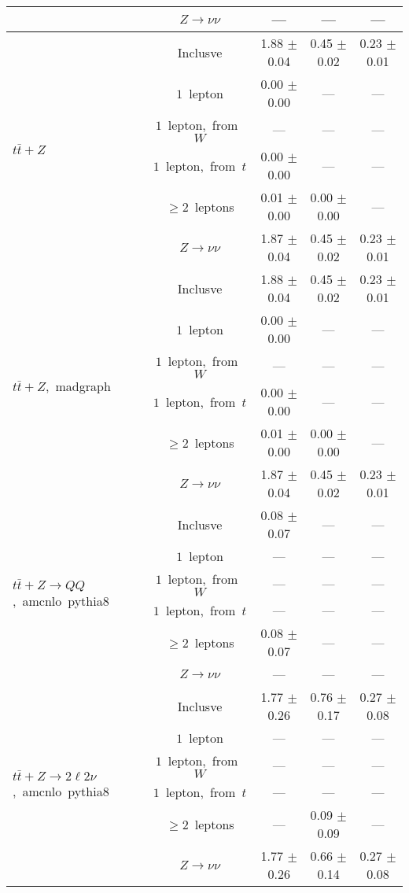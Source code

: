 \documentclass{article}
\begin{document}
\begin{longtable}{|l|c|c|c|c|}
 & $Z\rightarrow\nu\nu$  & ---  & ---  & --- \\* 
\hline 
\multirow{6}{*}{$t\bar{t}+Z$} & Inclusve  & 1.88 $\pm$ 0.04  & 0.45 $\pm$ 0.02  & 0.23 $\pm$ 0.01 \\* 
 & $1$~lepton  & 0.00 $\pm$ 0.00  & ---  & --- \\* 
 & $1$~lepton,~from~$W$  & ---  & ---  & --- \\* 
 & $1$~lepton,~from~$t$  & 0.00 $\pm$ 0.00  & ---  & --- \\* 
 & $\ge2$~leptons  & 0.01 $\pm$ 0.00  & 0.00 $\pm$ 0.00  & --- \\* 
 & $Z\rightarrow\nu\nu$  & 1.87 $\pm$ 0.04  & 0.45 $\pm$ 0.02  & 0.23 $\pm$ 0.01 \\* 
\hline 
\multirow{6}{*}{$t\bar{t}+Z$,~madgraph} & Inclusve  & 1.88 $\pm$ 0.04  & 0.45 $\pm$ 0.02  & 0.23 $\pm$ 0.01 \\* 
 & $1$~lepton  & 0.00 $\pm$ 0.00  & ---  & --- \\* 
 & $1$~lepton,~from~$W$  & ---  & ---  & --- \\* 
 & $1$~lepton,~from~$t$  & 0.00 $\pm$ 0.00  & ---  & --- \\* 
 & $\ge2$~leptons  & 0.01 $\pm$ 0.00  & 0.00 $\pm$ 0.00  & --- \\* 
 & $Z\rightarrow\nu\nu$  & 1.87 $\pm$ 0.04  & 0.45 $\pm$ 0.02  & 0.23 $\pm$ 0.01 \\* 
\hline 
\multirow{6}{*}{$t\bar{t}+Z{\rightarrow}QQ$,~amcnlo~pythia8} & Inclusve  & 0.08 $\pm$ 0.07  & ---  & --- \\* 
 & $1$~lepton  & ---  & ---  & --- \\* 
 & $1$~lepton,~from~$W$  & ---  & ---  & --- \\* 
 & $1$~lepton,~from~$t$  & ---  & ---  & --- \\* 
 & $\ge2$~leptons  & 0.08 $\pm$ 0.07  & ---  & --- \\* 
 & $Z\rightarrow\nu\nu$  & ---  & ---  & --- \\* 
\hline 
\multirow{6}{*}{$t\bar{t}+Z{\rightarrow}2{\ell}2{\nu}$,~amcnlo~pythia8} & Inclusve  & 1.77 $\pm$ 0.26  & 0.76 $\pm$ 0.17  & 0.27 $\pm$ 0.08 \\* 
 & $1$~lepton  & ---  & ---  & --- \\* 
 & $1$~lepton,~from~$W$  & ---  & ---  & --- \\* 
 & $1$~lepton,~from~$t$  & ---  & ---  & --- \\* 
 & $\ge2$~leptons  & ---  & 0.09 $\pm$ 0.09  & --- \\* 
 & $Z\rightarrow\nu\nu$  & 1.77 $\pm$ 0.26  & 0.66 $\pm$ 0.14  & 0.27 $\pm$ 0.08 \\* 
\hline 
\end{longtable} 
\end{document}
